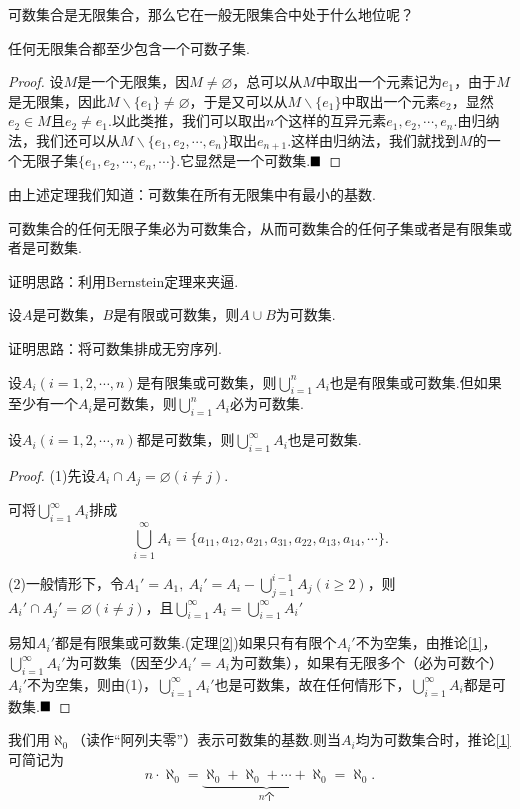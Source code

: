 可数集合是无限集合，那么它在一般无限集合中处于什么地位呢？
\begin{theorem}
	任何无限集合都至少包含一个可数子集.
\end{theorem}
\begin{proof}
	设$M$是一个无限集，因$M\neq\varnothing$，总可以从$M$中取出一个元素记为$e_1$，由于$M$是无限集，因此$M\backslash\{e_1\}\neq\varnothing$，于是又可以从$M\backslash\{e_1\}$中取出一个元素$e_2$，显然$e_2\in M$且$e_2\neq e_1$.以此类推，我们可以取出$n$个这样的互异元素$e_1,e_2,\cdots,e_n$.由归纳法，我们还可以从$M\backslash\{e_1,e_2,\cdots,e_n\}$取出$e_{n+1}$.这样由归纳法，我们就找到$M$的一个无限子集$\{e_1,e_2,\cdots,e_n,\cdots\}$.它显然是一个可数集.$\hfill\blacksquare$
\end{proof}
由上述定理我们知道：{\heiti 可数集在所有无限集中有最小的基数}.
\begin{theorem}\label{2}
	可数集合的任何无限子集必为可数集合，从而可数集合的任何子集或者是有限集或者是可数集.
\end{theorem}
证明思路：利用Bernstein定理来夹逼.
\begin{theorem}
	设$A$是可数集，$B$是有限或可数集，则$A\cup B$为可数集.
\end{theorem}
证明思路：将可数集排成无穷序列.
\begin{corollary}\label{1}
	设$A_i(i=1,2,\cdots,n)$是有限集或可数集，则$\bigcup\limits_{i=1}^{n}A_i$也是有限集或可数集.但如果至少有一个$A_i$是可数集，则$\bigcup\limits_{i=1}^{n}A_i$必为可数集.
\end{corollary}
\begin{theorem}\label{4}
	设$A_i(i=1,2,\cdots,n)$都是可数集，则$\bigcup\limits_{i=1}^{\infty}A_i$也是可数集.
\end{theorem}
\begin{proof}
	(1)先设$A_i\cap A_j=\varnothing(i\neq j)$.
	
	可将$\bigcup\limits_{i=1}^{\infty}A_i$排成
	$$\bigcup_{i=1}^{\infty}A_i=\{a_{11},a_{12},a_{21},a_{31},a_{22},a_{13},a_{14},\cdots\}.$$
	
	(2)一般情形下，令$A_1'=A_1,\ A_i'=A_i-\bigcup\limits_{j=1}^{i-1}A_j(i\geqslant 2)$，则$A_i'\cap A_j'=\varnothing(i\neq j)$，且$\bigcup\limits_{i=1}^{\infty}A_i=\bigcup\limits_{i=1}^{\infty}A_i'$
	
	易知$A_i'$都是有限集或可数集.(定理\ref{2})如果只有有限个$A_i'$不为空集，由推论\ref{1}，$\bigcup\limits_{i=1}^{\infty}A_i'$为可数集（因至少$A_i'=A_i$为可数集），如果有无限多个（必为可数个）$A_i'$不为空集，则由(1)，$\bigcup\limits_{i=1}^{\infty}A_i'$也是可数集，故在任何情形下，$\bigcup\limits_{i=1}^{\infty}A_i$都是可数集.$\hfill\blacksquare$
\end{proof}
我们用$\aleph_0$（读作“阿列夫零”）表示可数集的基数.则当$A_i$均为可数集合时，推论\ref{1}可简记为
$$n\cdot \aleph_0=\underbrace{\aleph_0+\aleph_0+\cdots+\aleph_0}_{n\text{个}}=\aleph_0.$$

